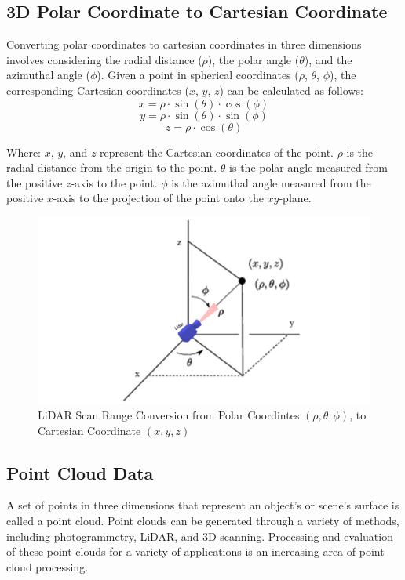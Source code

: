\subsection{3D Polar Coordinate to Cartesian Coordinate}
Converting polar coordinates to cartesian coordinates in three dimensions involves considering the radial distance ($\rho$), the polar angle ($\theta$), and the azimuthal angle ($\phi$). Given a point in spherical coordinates ($\rho$, $\theta$, $\phi$), the corresponding Cartesian coordinates ($x$, $y$, $z$) can be calculated as follows:
\begin{equation}
	x = \rho \cdot \sin(\theta) \cdot \cos(\phi)
\end{equation}
\begin{equation}
	y = \rho \cdot \sin(\theta) \cdot \sin(\phi)
\end{equation}
\begin{equation}
	z = \rho \cdot \cos(\theta)
\end{equation}

Where:
$x$, $y$, and $z$ represent the Cartesian coordinates of the point.
$\rho$ is the radial distance from the origin to the point.
$\theta$ is the polar angle measured from the positive $z$-axis to the point.
$\phi$ is the azimuthal angle measured from the positive $x$-axis to the projection of the point onto the $xy$-plane.

\begin{figure}[H]
	\centering
	\includegraphics[width=1\textwidth]{Figures/point cloud conversion}
	\caption{LiDAR Scan Range Conversion from Polar Coordintes $(\rho,\theta,\phi)$, to Cartesian Coordinate $(x,y,z)$}
	\label{ch3:fig:point_cloud_conversion}
\end{figure}

\subsection{Point Cloud Data}
A set of points in three dimensions that represent an object's or scene's surface is called a point cloud. Point clouds can be generated through a variety of methods, including photogrammetry, LiDAR, and 3D scanning. Processing and evaluation of these point clouds for a variety of applications is an increasing area of point cloud processing.


